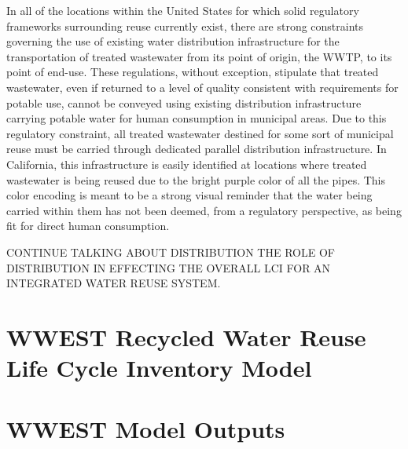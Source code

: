 In all of the locations within the United States for which solid regulatory frameworks surrounding reuse currently exist, there are strong constraints governing the use of existing water distribution infrastructure for the transportation of treated wastewater from its point of origin, the WWTP, to its point of end-use. These regulations, without exception, stipulate that treated wastewater, even if returned to a level of quality consistent with requirements for potable use, cannot be conveyed using existing distribution infrastructure carrying potable water for human consumption in municipal areas. Due to this regulatory constraint, all treated wastewater destined for some sort of municipal reuse must be carried through dedicated parallel distribution infrastructure. In California, this infrastructure is easily identified at locations where treated wastewater is being reused due to the bright purple color of all the pipes. This color encoding is meant to be a strong visual reminder that the water being carried within them has not been deemed, from a regulatory perspective, as being fit for direct human consumption. 

CONTINUE TALKING ABOUT DISTRIBUTION THE ROLE OF DISTRIBUTION IN EFFECTING THE OVERALL LCI FOR AN INTEGRATED WATER REUSE SYSTEM.
 
\section{WWEST Recycled Water Reuse Life Cycle Inventory Model}
\section{WWEST Model Outputs}